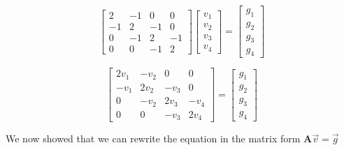 \documentclass[english,notitlepage]{revtex4-1}  %
\begin{document}
$$
  \begin{bmatrix}        2 & -1 & 0 & 0 \\        -1 & 2 & -1 & 0 \\        0 & -1 & 2 & -1 \\        0 & 0 & -1 & 2    \end{bmatrix} \begin{bmatrix}        v_1\\        v_2\\        v_3\\        v_4    \end{bmatrix} = \begin{bmatrix}        g_1\\        g_2\\        g_3\\        g_4    \end{bmatrix}
$$

$$
   \begin{bmatrix}        2v_1 & -v_2 & 0 & 0 \\        -v_1 & 2v_2 & -v_3 & 0 \\        0 & -v_2 & 2v_3 & -v_4 \\        0 & 0 & -v_3 & 2v_4    \end{bmatrix} = \begin{bmatrix}
g_1 \\
g_2 \\
g_3 \\
g_4
\end{bmatrix}
$$

We now showed that we can rewrite the equation in the matrix form $\mathbf{A} \vec{v} = \vec{g}$
\end{document}

